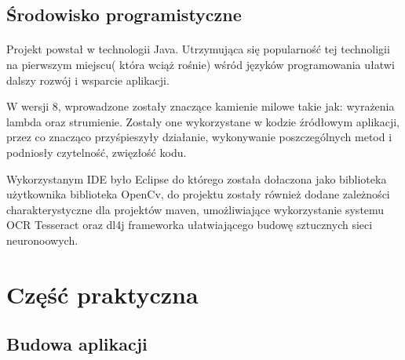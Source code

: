 \documentclass[a4paper,12pt]{article}
\begin{document}
	\subsection{Środowisko programistyczne}
		\paragraph{} Projekt powstał w technologii Java. Utrzymująca się popularność tej technoligii na pierwszym miejscu( która wciąż rośnie) wśród języków programowania ułatwi dalszy rozwój i wsparcie aplikacji.  \par
        W wersji 8, wprowadzone zostały znaczące kamienie milowe takie jak: wyrażenia lambda oraz strumienie. Zostały one wykorzystane w kodzie źródłowym aplikacji, przez co znacząco przyśpieszyły działanie, wykonywanie poszczególnych metod i podniosły czytelność, zwięzłość kodu. \par
        Wykorzystanym IDE było Eclipse do którego została dołaczona jako biblioteka użytkownika biblioteka OpenCv, do projektu zostały również dodane zależności charakterystyczne dla projektów maven, umożliwiające wykorzystanie systemu OCR Tesseract oraz dl4j frameworka ułatwiającego budowę sztucznych sieci neuronoowych. 

        \newpage
        
\section{Część praktyczna}
	\subsection{Budowa aplikacji}
\end{document}

